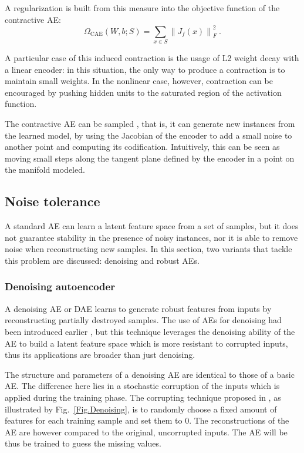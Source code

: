 \documentclass[preprint,5p,compress]{elsarticle}
\begin{document}
A regularization is built from this measure into the objective function of the contractive AE:
\begin{equation}
  \Omega_{\mathrm{CAE}}(W,b;S) = \sum_{x\in S}\left\lVert J_f(x) \right\rVert_F^2~.
\end{equation}

A particular case of this induced contraction is the usage of L2 weight decay with a linear encoder: in this situation, the only way to produce a contraction is to maintain small weights. In the nonlinear case, however, contraction can be encouraged by pushing hidden units to the saturated region of the activation function.

The contractive AE can be sampled \cite{generativeCAE}, that is, it can generate new instances from the learned model, by using the Jacobian of the encoder to add a small noise to another point and computing its codification. Intuitively, this can be seen as moving small steps along the tangent plane defined by the encoder in a point on the manifold modeled.


\subsection{Noise tolerance}\label{Sec.NoiseTolerance}

A standard AE can learn a latent feature space from a set of samples, but it does not guarantee stability in the presence of noisy instances, nor it is able to remove noise when reconstructing new samples. In this section, two variants that tackle this problem are discussed: denoising and robust AEs.

\subsubsection{Denoising autoencoder}

A denoising AE or DAE \cite{vincent_denoising_2008} learns to generate robust features from inputs by reconstructing partially destroyed samples. The use of AEs for denoising had been introduced earlier \cite{yann1987modeles}, but this technique leverages the denoising ability of the AE to build a latent feature space which is more resistant to corrupted inputs, thus its applications are broader than just denoising. 

The structure and parameters of a denoising AE are identical to those of a basic AE. The difference here lies in a stochastic corruption of the inputs which is applied during the training phase. The corrupting technique proposed in \cite{vincent_denoising_2008}, as illustrated by Fig.~\ref{Fig.Denoising}, is to randomly choose a fixed amount of features for each training sample and set them to 0. The reconstructions of the AE are however compared to the original, uncorrupted inputs. The AE will be thus be trained to guess the missing values.
\end{document}
